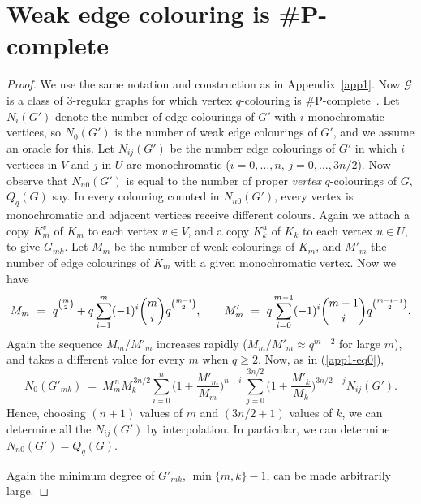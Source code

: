 \documentclass[11pt]{article}
\theoremstyle{definition}
\theoremstyle{remark}
\newcommand{\CG}{\mathcal{G}}
\newcommand{\binpower}[2]{#1\rule{0in}{2.2ex}^{{\binom{#2}{2}}}}
\begin{document}
\section{Weak edge colouring is \#P-complete}
\label{app2}
\begin{proof}
We use the same notation and construction as in Appendix~\ref{app1}. Now
$\CG$ is a class of $3$-regular graphs for which vertex $q$-colouring is
\#P-complete~\cite[Theorem 2.2]{G00}. Let $N_i(G')$ denote the number of
edge colourings of $G'$ with $i$ monochromatic vertices, so $N_0(G')$ is
the number of weak edge colourings of $G'$, and we assume an oracle for
this. Let $N_{ij}(G')$ be the number edge colourings of $G'$ in which $i$
vertices in $V$ and $j$ in $U$ are monochromatic
($i=0,\ldots,n,\,j=0,\ldots,3n/2$). Now observe that $N_{n0}(G')$ is equal
to the number of proper \emph{vertex} $q$-colourings of $G$, $Q_q(G)$ say.
In every colouring counted in $N_{n0}(G')$, every vertex is monochromatic
and adjacent vertices receive different colours. Again we attach a copy
$K_m^v$ of $K_m$ to each vertex $v\in V$, and a copy $K_k^u$ of $K_k$ to
each vertex $u\in U$, to give $G_{mk}$. Let $M_m$ be the number of weak
colourings of $K_m$, and $M'_m$ the number of edge colourings of $K_m$ with
a given monochromatic vertex. Now we have
\begin{equation*}
    M_m\ =\ \binpower{q}{m}+q\sum_{i=1}^{m}(-1)^i \binom{m}{i}
    \binpower{q}{m-i},\qquad
    M'_m\ =\ q\sum_{i=0}^{m-1}(-1)^i \binom{m-1}{i}
    \binpower{q}{m-i-1}.
\end{equation*}
Again the sequence $M_m/M'_m$ increases rapidly ($M_m/M'_m\approx q^{m-2}$
for large $m$), and takes a different value for every $m$ when $q\geq 2$.
Now, as in (\ref{app1-eq0}),
\begin{equation*}
N_{0}(G'_{mk})\ =\ M_m^{\,n}M_k^{\,3n/2}\sum_{i=0}^n
\bigg(1+\frac{M'_m}{M_m}\bigg)^{n-i}\ \sum_{j=0}^{3n/2}
\bigg(1+\frac{M'_k}{M_k}\bigg)^{3n/2-j}N_{ij}(G').
\end{equation*}
Hence, choosing $(n+1)$ values of $m$ and $(3n/2 +1)$ values of $k$, we can
determine all the $N_{ij}(G')$ by interpolation. In particular, we can
determine $N_{n0}(G')=Q_q(G)$.

Again the minimum degree of $G'_{mk}$, $\min\{m,k\}-1$, can be made
arbitrarily large.
\end{proof}
\end{document}
